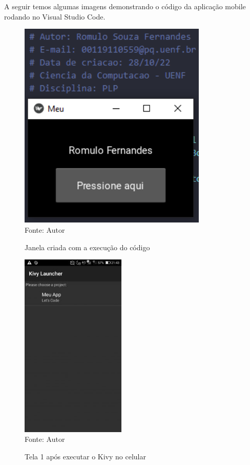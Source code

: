 	A seguir temos algumas imagens demonstrando o código da aplicação mobile rodando no Visual Studio Code.
	
		\begin{figure}[H]
		\begin{center}
			\caption{Janela criada com a execução do código} \label{ling1}
			\includegraphics[width=9cm]{mobile.PNG} \\
			{\tiny \sf Fonte:{ Autor}}
		\end{center}
	\end{figure}

\begin{figure}[H]
	\begin{center}
		\caption{Tela 1 após executar o Kivy no celular} \label{ling1}
		\includegraphics[width=5cm]{1mobile.JPG} \\
		{\tiny \sf Fonte:{ Autor}}
	\end{center}
\end{figure}

